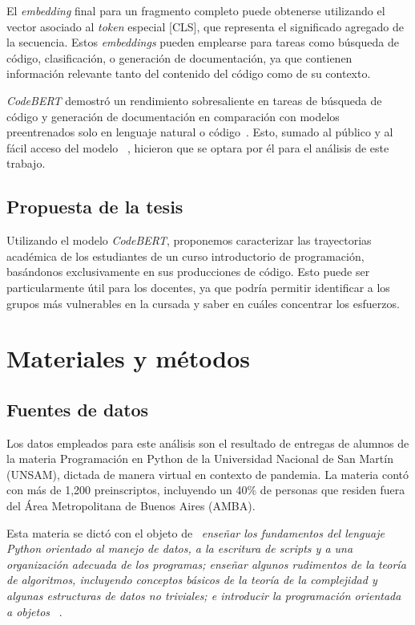 \documentclass[11pt,a4paper,twoside,openany]{tesis}
\begin{document}
El \emph{embedding} final para un fragmento completo puede obtenerse utilizando el vector asociado al \emph{token} especial [CLS], que representa el significado agregado de la secuencia. Estos \emph{embeddings} pueden emplearse para tareas como búsqueda de código, clasificación, o generación de documentación, ya que contienen información relevante tanto del contenido del código como de su contexto.

\emph{CodeBERT} demostró un rendimiento sobresaliente en tareas de búsqueda de código y generación de documentación en comparación con modelos preentrenados solo en lenguaje natural o código~\cite{codeBert}. Esto, sumado al público y al fácil acceso del modelo~\cite{codeBert-repo} , hicieron que se optara por él para el análisis de este trabajo.


\section{Propuesta de la tesis}

Utilizando el modelo \emph{CodeBERT}, proponemos caracterizar las trayectorias académica de los estudiantes de un curso introductorio de programación, basándonos exclusivamente en sus producciones de código. Esto puede ser particularmente útil para los docentes, ya que podría permitir identificar a los grupos más vulnerables en la cursada y saber en cuáles concentrar los esfuerzos.

\chapter{Materiales y métodos}
\section{Fuentes de datos}
Los datos empleados para este análisis son el resultado de entregas de alumnos de la materia Programación en Python de la Universidad Nacional de San Martín (UNSAM), dictada de manera virtual en contexto de pandemia.  La materia contó con más de 1,200 preinscriptos, incluyendo  un  40\%  de  personas  que  residen  fuera  del  Área  Metropolitana de Buenos Aires (AMBA).

Esta materia se dictó con el objeto de ~\emph{enseñar los fundamentos del lenguaje Python orientado al manejo de datos, a la escritura de \emph{scripts} y a una organización adecuada de los programas; enseñar  algunos  rudimentos  de  la  teoría  de  algoritmos,  incluyendo  conceptos  básicos  de  la teoría de la complejidad y algunas estructuras de datos no triviales; e introducir la programación orientada a objetos} ~\cite{unsam2020}.
\end{document}
